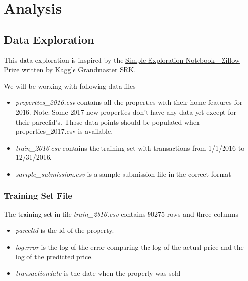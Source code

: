 \documentclass[a4paper]{article}
\begin{document}
\section{Analysis}

\subsection{Data Exploration}
This data exploration is inspired by the
\href{https://www.kaggle.com/sudalairajkumar/simple-exploration-notebook-zillow-prize}{Simple Exploration Notebook - Zillow Prize}
written by Kaggle Grandmaster \href{https://www.kaggle.com/sudalairajkumar}{SRK}.

We will be working with following data files
\begin{itemize}
    \item \textit{properties\_2016.csv} contains all the properties with their home features for 2016. Note: Some 2017 new
    properties don't have any data yet except for their parcelid's. Those data points should be populated when
    properties\_2017.csv is available.
    \item \textit{train\_2016.csv} contains the training set with transactions from 1/1/2016 to 12/31/2016.
    \item \textit{sample\_submission.csv} is a sample submission file in the correct format
\end{itemize}

\subsubsection{Training Set File}
The training set in file \textit{train\_2016.csv} contains 90275 rows and three columns
\begin{itemize}
    \item \textit{parcelid} is the id of the property.
    \item \textit{logerror} is the log of the error comparing the log of the actual price and the log of the
        predicted price.
    \item \textit{transactiondate} is the date when the property was sold
\end{itemize}
\end{document}
